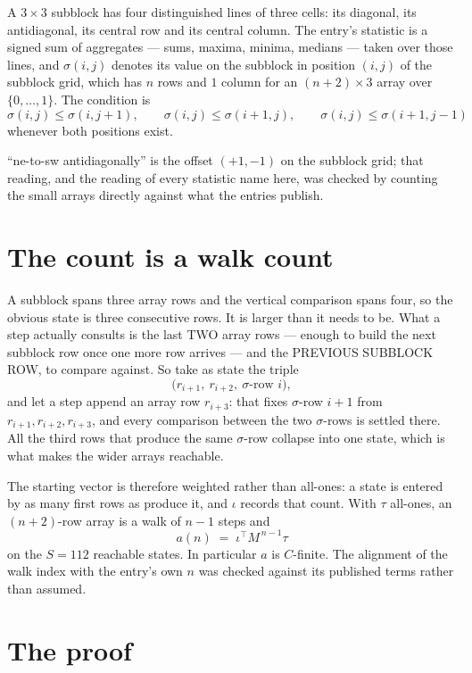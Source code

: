 \documentclass[11pt,a4paper]{article}
\theoremstyle{plain}
\theoremstyle{definition}
\begin{document}
A $3\times3$ subblock has four distinguished lines of three cells: its diagonal, its
antidiagonal, its central row and its central column. The entry's statistic is a signed sum of
aggregates --- sums, maxima, minima, medians --- taken over those lines, and $\sigma(i,j)$
denotes its value on the subblock in position $(i,j)$ of the subblock grid, which has $n$ rows
and $1$ column for an $(n+2)\times3$ array over $\{0,\dots,1\}$. The condition is
\[
\sigma(i,j)\le\sigma(i,j+1),\qquad \sigma(i,j)\le\sigma(i+1,j),\qquad \sigma(i,j)\le\sigma(i+1,j-1)
\]
whenever both positions exist.

``ne-to-sw antidiagonally'' is the offset $(+1,-1)$ on the subblock grid; that reading, and
the reading of every statistic name here, was checked by counting the small arrays directly
against what the entries publish.

\section{The count is a walk count}

A subblock spans three array rows and the vertical comparison spans four, so the obvious state
is three consecutive rows. It is larger than it needs to be. What a step actually consults is
the last TWO array rows --- enough to build the next subblock row once one more row arrives ---
and the PREVIOUS SUBBLOCK ROW, to compare against. So take as state the triple
\[
\bigl(r_{i+1},\ r_{i+2},\ \sigma\text{-row }i\bigr),
\]
and let a step append an array row $r_{i+3}$: that fixes $\sigma$-row $i+1$ from
$r_{i+1},r_{i+2},r_{i+3}$, and every comparison between the two $\sigma$-rows is settled
there. All the third rows that produce the same $\sigma$-row collapse into one state, which is
what makes the wider arrays reachable.

The starting vector is therefore weighted rather than all-ones: a state is entered by as many
first rows as produce it, and $\iota$ records that count. With $\tau$ all-ones, an
$(n+2)$-row array is a walk of $n-1$ steps and
\[
a(n)\;=\;\iota^{\!\top}M^{\,n-1}\tau
\]
on the $S=112$ reachable states. In particular $a$ is $C$-finite. The alignment of the walk
index with the entry's own $n$ was checked against its published terms rather than assumed.

\section{The proof}
\end{document}

